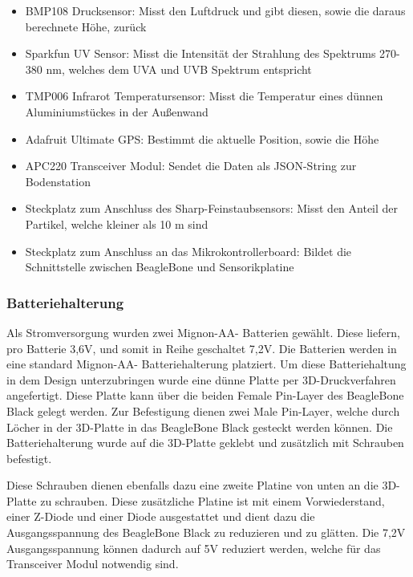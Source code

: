 \begin{itemize}
	\item BMP108 Drucksensor: Misst den Luftdruck und gibt diesen, sowie die daraus berechnete Höhe, zurück
	\item Sparkfun UV Sensor: Misst die Intensität der Strahlung des Spektrums 270-380 nm, welches dem UVA und UVB Spektrum entspricht
	\item TMP006 Infrarot Temperatursensor: Misst die Temperatur eines dünnen Aluminiumstückes in der Außenwand 
	\item Adafruit Ultimate GPS: Bestimmt die aktuelle Position, sowie die Höhe
	\item APC220 Transceiver Modul: Sendet die Daten als JSON-String zur Bodenstation
	\item Steckplatz zum Anschluss des Sharp-Feinstaubsensors: Misst den Anteil der Partikel, welche kleiner als 10 \textmu m sind
	\item Steckplatz zum Anschluss an das Mikrokontrollerboard: Bildet die Schnittstelle zwischen BeagleBone und Sensorikplatine
\end{itemize}

\subsubsection{Batteriehalterung}
Als Stromversorgung wurden zwei Mignon-AA- Batterien gewählt. Diese liefern, pro Batterie 3,6V, und somit in Reihe geschaltet 7,2V. Die Batterien werden in eine standard Mignon-AA- Batteriehalterung platziert. Um diese Batteriehaltung in dem Design unterzubringen wurde eine dünne Platte per 3D-Druckverfahren angefertigt. Diese Platte kann über die beiden Female Pin-Layer des BeagleBone Black gelegt werden. Zur Befestigung dienen zwei Male Pin-Layer, welche durch Löcher in der 3D-Platte in das BeagleBone Black gesteckt werden können. Die Batteriehalterung wurde auf die 3D-Platte geklebt und zusätzlich mit Schrauben befestigt.

Diese Schrauben dienen ebenfalls dazu eine zweite Platine von unten an die 3D-Platte zu schrauben. Diese zusätzliche Platine ist mit einem Vorwiederstand, einer Z-Diode und einer Diode ausgestattet und dient dazu die Ausgangsspannung des BeagleBone Black zu reduzieren und zu glätten. Die 7,2V Ausgangsspannung können dadurch auf 5V reduziert werden, welche für das Transceiver Modul notwendig sind.